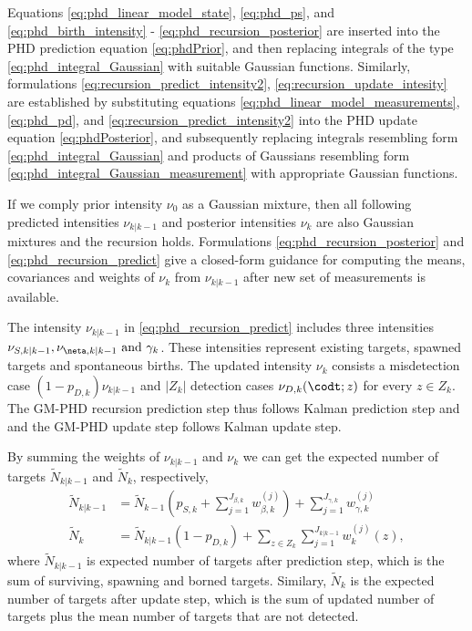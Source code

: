 Equations \eqref{eq:phd_linear_model_state}, \eqref{eq:phd_ps}, and \eqref{eq:phd_birth_intensity} - \eqref{eq:phd_recursion_posterior} are inserted into the PHD prediction equation \eqref{eq:phdPrior}, and then replacing integrals of the type \eqref{eq:phd_integral_Gaussian} with suitable Gaussian functions. Similarly, formulations \eqref{eq:recursion_predict_intensity2}, \eqref{eq:recursion_update_intesity} are established by substituting equations \eqref{eq:phd_linear_model_measurements}, \eqref{eq:phd_pd}, and \eqref{eq:recursion_predict_intensity2} into the PHD update equation \eqref{eq:phdPosterior}, and subsequently replacing integrals resembling form \eqref{eq:phd_integral_Gaussian} and products of Gaussians resembling form \eqref{eq:phd_integral_Gaussian_measurement} with appropriate Gaussian functions.

If we comply prior intensity $\nu_0$ as a Gaussian mixture, then all following predicted intensities $\nu_{k|k-1}$ and posterior intensities $\nu_k$ are also Gaussian mixtures and the recursion holds. Formulations \eqref{eq:phd_recursion_posterior} and \eqref{eq:phd_recursion_predict} give a closed-form guidance for computing the means, covariances and weights of $\nu_k$ from $\nu_{k|k-1}$ after new set of measurements is available.

The intensity $\nu_{k|k-1}$ in \eqref{eq:phd_recursion_predict} includes three intensities $\nu_{S,k|k-1}, \nu_{\neta,k|k-1} \text{ and } \gamma_k$. These intensities represent existing targets, spawned targets and spontaneous births. The updated intensity $\nu_k$ consists a misdetection case $(1-p_{D,k})\nu_{k|k-1}$ and $|Z_k|$ detection cases $\nu_{D,k}(\codt;z)$ for every $z \in Z_k$. The GM-PHD recursion prediction step thus follows Kalman prediction step and and the GM-PHD update step follows Kalman update step.

By summing the weights of $\nu_{k|k-1}$ and $\nu_k$ we can get the expected number of targets $\tilde{N}_{k|k-1}$ and $\tilde{N}_k$, respectively,
\begin{align}
    \tilde{N}_{k|k-1} &=\tilde{N}_{k-1} \left( p_{S,k} + \sum_{j=1}^{J_{\beta,k}} w_{\beta,k}^{(j)} \right) + \sum_{j=1}^{J_{\gamma,k}} w_{\gamma,k}^{(j)} \\
    \tilde{N}_k &= \tilde{N}_{k|k-1} (1 - p_{D,k}) + \sum_{z \in Z_k} \sum_{j=1}^{J_{k|k-1}} w_k^{(j)}(z),
\end{align}
where $\tilde{N}_{k|k-1}$ is expected number of targets after prediction step, which is the sum of surviving, spawning and borned targets. Similary, $\tilde{N}_k$ is the expected number of targets after update step, which is the sum of updated number of targets plus the mean number of targets
that are not detected.

